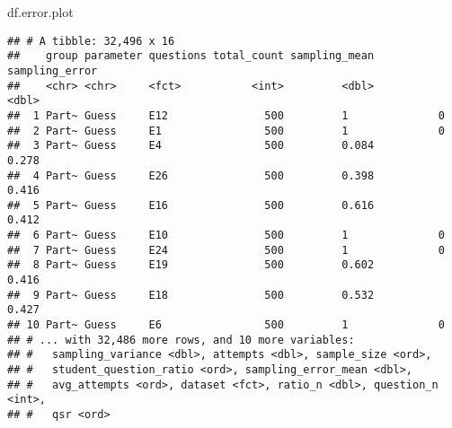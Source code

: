 \documentclass[]{article}
\newenvironment{Shaded}{\begin{snugshade}}{\end{snugshade}}
\newcommand{\NormalTok}[1]{#1}
\begin{document}
\begin{Shaded}
\begin{Highlighting}[]
\NormalTok{df.error.plot}
\end{Highlighting}
\end{Shaded}

\begin{verbatim}
## # A tibble: 32,496 x 16
##    group parameter questions total_count sampling_mean sampling_error
##    <chr> <chr>     <fct>           <int>         <dbl>          <dbl>
##  1 Part~ Guess     E12               500         1              0    
##  2 Part~ Guess     E1                500         1              0    
##  3 Part~ Guess     E4                500         0.084          0.278
##  4 Part~ Guess     E26               500         0.398          0.416
##  5 Part~ Guess     E16               500         0.616          0.412
##  6 Part~ Guess     E10               500         1              0    
##  7 Part~ Guess     E24               500         1              0    
##  8 Part~ Guess     E19               500         0.602          0.416
##  9 Part~ Guess     E18               500         0.532          0.427
## 10 Part~ Guess     E6                500         1              0    
## # ... with 32,486 more rows, and 10 more variables:
## #   sampling_variance <dbl>, attempts <dbl>, sample_size <ord>,
## #   student_question_ratio <ord>, sampling_error_mean <dbl>,
## #   avg_attempts <ord>, dataset <fct>, ratio_n <dbl>, question_n <int>,
## #   qsr <ord>
\end{verbatim}
\end{document}
